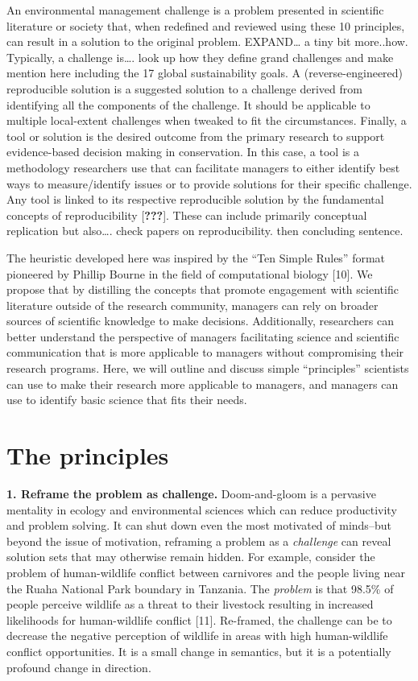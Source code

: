 \documentclass[10pt,letterpaper]{article}
\begin{document}
An environmental management challenge is a problem presented in
scientific literature or society that, when redefined and reviewed using
these 10 principles, can result in a solution to the original problem.
EXPAND\ldots{} a tiny bit more..how. Typically, a challenge is\ldots{}.
look up how they define grand challenges and make mention here including
the 17 global sustainability goals. A (reverse-engineered) reproducible
solution is a suggested solution to a challenge derived from identifying
all the components of the challenge. It should be applicable to multiple
local-extent challenges when tweaked to fit the circumstances. Finally,
a tool or solution is the desired outcome from the primary research to
support evidence-based decision making in conservation. In this case, a
tool is a methodology researchers use that can facilitate managers to
either identify best ways to measure/identify issues or to provide
solutions for their specific challenge. Any tool is linked to its
respective reproducible solution by the fundamental concepts of
reproducibility {[}{\textbf{???}}{]}. These can include primarily
conceptual replication but also\ldots{}. check papers on
reproducibility. then concluding sentence.

The heuristic developed here was inspired by the ``Ten Simple Rules''
format pioneered by Phillip Bourne in the field of computational biology
{[}10{]}. We propose that by distilling the concepts that promote
engagement with scientific literature outside of the research community,
managers can rely on broader sources of scientific knowledge to make
decisions. Additionally, researchers can better understand the
perspective of managers facilitating science and scientific
communication that is more applicable to managers without compromising
their research programs. Here, we will outline and discuss simple
``principles'' scientists can use to make their research more applicable
to managers, and managers can use to identify basic science that fits
their needs.

\section{The principles}\label{the-principles}

\textbf{1. Reframe the problem as challenge.} Doom-and-gloom is a
pervasive mentality in ecology and environmental sciences which can
reduce productivity and problem solving. It can shut down even the most
motivated of minds--but beyond the issue of motivation, reframing a
problem as a \emph{challenge} can reveal solution sets that may
otherwise remain hidden. For example, consider the problem of
human-wildlife conflict between carnivores and the people living near
the Ruaha National Park boundary in Tanzania. The \emph{problem} is that
98.5\% of people perceive wildlife as a threat to their livestock
resulting in increased likelihoods for human-wildlife conflict {[}11{]}.
Re-framed, the challenge can be to decrease the negative perception of
wildlife in areas with high human-wildlife conflict opportunities. It is
a small change in semantics, but it is a potentially profound change in
direction.
\end{document}
